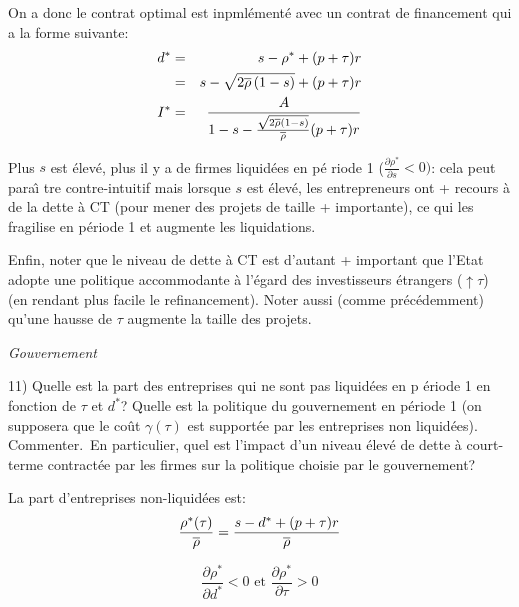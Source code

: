 \documentclass[a4paper]{article}
\begin{document}
On a donc le contrat optimal est inpml\'{e}ment\'{e} avec un contrat de
financement qui a la forme suivante:%
\begin{eqnarray*}
d^{\ast } &=&s-\rho ^{\ast }+(p+\tau )r \\
&=&s-\sqrt{2\overline{\rho }\left( 1-s\right) }+(p+\tau )r \\
I^{\ast } &=&\frac{A}{1-s-\frac{\sqrt{2\overline{\rho }\left( 1-s\right) }}{%
\overline{\rho }}(p+\tau )r}
\end{eqnarray*}

Plus $s$ est \'{e}lev\'{e}, plus il y a de firmes liquid\'{e}es en p\'{e}%
riode 1 ($\frac{\partial \rho ^{\ast }}{\partial s}<0)$: cela peut para\^{\i}%
tre contre-intuitif mais lorsque $s$ est \'{e}lev\'{e}, les entrepreneurs
ont + recours \`{a} de la dette \`{a} CT (pour mener des projets de taille +
importante), ce qui les fragilise en p\'{e}riode 1 et augmente les
liquidations.

Enfin, noter que le niveau de dette \`{a} CT est d'autant + important que
l'Etat adopte une politique accommodante \`{a} l'\'{e}gard des investisseurs 
\'{e}trangers ($\uparrow \tau $) (en rendant plus facile le refinancement).
Noter aussi (comme pr\'{e}c\'{e}demment) qu'une hausse de $\tau $ augmente
la taille des projets.

\bigskip \pagebreak

\textit{Gouvernement}

\bigskip

11) Quelle est la part des entreprises qui ne sont pas liquid\'{e}es en p%
\'{e}riode 1 en fonction de $\tau $ et $d^{\ast }$? Quelle est la politique
du gouvernement en p\'{e}riode 1 (on supposera que le co\^{u}t $\gamma (\tau
)$ est support\'{e}e par les entreprises non liquid\'{e}es). Commenter.\ En
particulier, quel est l'impact d'un niveau \'{e}lev\'{e} de dette \`{a}
court-terme contract\'{e}e par les firmes sur la politique choisie par le
gouvernement?

\bigskip

La part d'entreprises non-liquid\'{e}es est:%
\begin{equation*}
\frac{\rho ^{\ast }(\tau )}{\overline{\rho }}=\frac{s-d^{\ast }+(p+\tau )r}{%
\overline{\rho }}
\end{equation*}

\begin{equation*}
\frac{\partial \rho ^{\ast }}{\partial d^{\ast }}<0\text{ et }\frac{\partial
\rho ^{\ast }}{\partial \tau }>0
\end{equation*}
\end{document}
